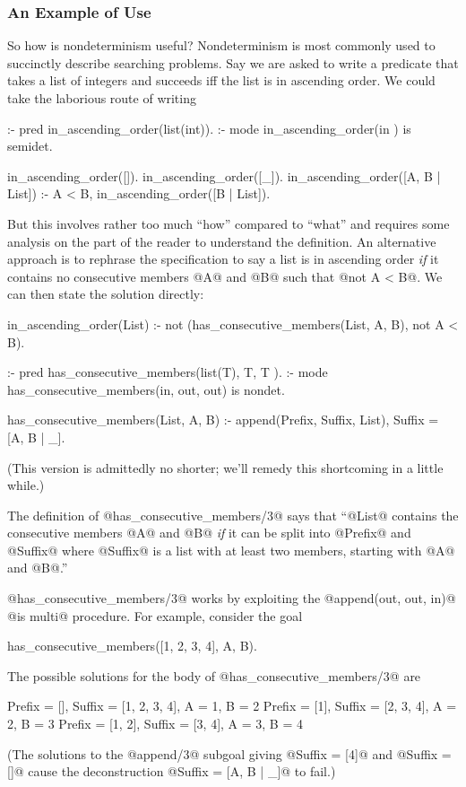 \subsubsection{An Example of Use}


So how is nondeterminism useful?  Nondeterminism is most commonly used
to succinctly describe searching problems.  Say we are asked to write a
predicate that takes a list of integers and succeeds iff the list is in
ascending order.  We could take the laborious route of writing
\begin{myverbatim}
:- pred in_ascending_order(list(int)).
:- mode in_ascending_order(in       ) is semidet.

in_ascending_order([]).
in_ascending_order([_]).
in_ascending_order([A, B | List]) :-
    A < B,
    in_ascending_order([B | List]).
\end{myverbatim}
But this involves rather too much ``how'' compared to ``what'' and
requires some analysis on the part of the reader to understand the
definition.  An alternative approach is to rephrase the specification to
say a list is in ascending order \emph{if} it contains no consecutive
members @A@ and @B@ such that @not A < B@.  We can then state the
solution directly:
\begin{myverbatim}
in_ascending_order(List) :-
    not (has_consecutive_members(List, A, B), not A < B).

:- pred has_consecutive_members(list(T), T,   T  ).
:- mode has_consecutive_members(in,      out, out) is nondet.

has_consecutive_members(List, A, B) :-
    append(Prefix, Suffix, List),
    Suffix = [A, B | _].
\end{myverbatim}
(This version is admittedly no shorter; we'll remedy this shortcoming in
a little while.)

The definition of @has_consecutive_members/3@ says that ``@List@
contains the consecutive members @A@ and @B@ \emph{if} it can be split
into @Prefix@ and @Suffix@ where @Suffix@ is a list with at least two
members, starting with @A@ and @B@.''

@has_consecutive_members/3@ works by exploiting the
@append(out, out, in)@ @is multi@ procedure.  For example, consider the
goal
\begin{myverbatim}
    has_consecutive_members([1, 2, 3, 4], A, B).
\end{myverbatim}
The possible solutions for the body of @has_consecutive_members/3@
are
\begin{myverbatim}
    Prefix = [],     Suffix = [1, 2, 3, 4], A = 1, B = 2
    Prefix = [1],    Suffix =    [2, 3, 4], A = 2, B = 3
    Prefix = [1, 2], Suffix =       [3, 4], A = 3, B = 4
\end{myverbatim}
(The solutions to the @append/3@ subgoal giving @Suffix = [4]@ and
@Suffix = []@ cause the deconstruction
@Suffix = [A, B | _]@ to fail.)

